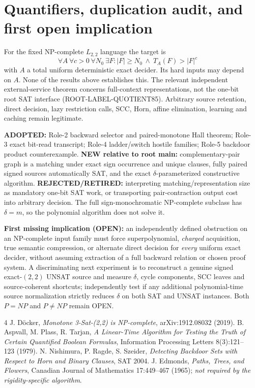 \documentclass[11pt]{article}
\begin{document}
\section{Quantifiers, duplication audit, and first open implication}
For the fixed NP-complete $L_{2,2}$ language the target is
\[
\forall A\ \forall c>0\ \forall N_0\
\exists F\colon |F|\ge N_0\ \wedge\ T_A(F)>|F|^c
\]
with $A$ a total uniform deterministic exact decider. Its hard inputs may depend on $A$. None of the results above establishes this. The relevant independent external-service theorem concerns full-context representations, not the one-bit root SAT interface (ROOT-LABEL-QUOTIENT85). Arbitrary source retention, direct decision, lazy restriction calls, SCC, Horn, affine elimination, learning and caching remain legitimate.
\par\noindent \textbf{ADOPTED:} Role-2 backward selector and paired-monotone Hall theorem; Role-3 exact bit-read transcript; Role-4 ladder/switch hostile families; Role-5 backdoor product counterexample. \textbf{NEW relative to root main:} complementary-pair graph is a matching under exact sign occurrence and unique clauses, fully paired signed sources automatically SAT, and the exact $\delta$-parameterized constructive algorithm. \textbf{REJECTED/RETIRED:} interpreting matching/representation size as mandatory one-bit SAT work, or transporting pair-contraction output cost into arbitrary decision. The full sign-monochromatic NP-complete subclass has $\delta=m$, so the polynomial algorithm does not solve it.
\par\noindent \textbf{First missing implication (OPEN):} an independently defined obstruction on an NP-complete input family must force superpolynomial, \emph{charged} acquisition, true semantic compression, or alternate direct decision for \emph{every} uniform exact decider, without assuming extraction of a full backward relation or chosen proof system. A discriminating next experiment is to reconstruct a genuine signed exact-$(2,2)$ UNSAT source and measure $\delta$, cycle components, SCC leaves and source-coherent shortcuts; independently test if any additional polynomial-time source normalization strictly reduces $\delta$ on both SAT and UNSAT instances. Both $P=NP$ and $P\ne NP$ remain OPEN.
\begin{thebibliography}{4}
 J. D\"ocker, \emph{Monotone 3-Sat-(2,2) is NP-complete}, arXiv:1912.08032 (2019).
\bibitem{apt} B. Aspvall, M. Plass, R. Tarjan, \emph{A Linear-Time Algorithm for Testing the Truth of Certain Quantified Boolean Formulas}, Information Processing Letters 8(3):121--123 (1979).
\bibitem{nrs} N. Nishimura, P. Ragde, S. Szeider, \emph{Detecting Backdoor Sets with Respect to Horn and Binary Clauses}, SAT 2004.
\bibitem{edmonds} J. Edmonds, \emph{Paths, Trees, and Flowers}, Canadian Journal of Mathematics 17:449--467 (1965); \emph{not required by the rigidity-specific algorithm}.
\end{thebibliography}
\end{document}
